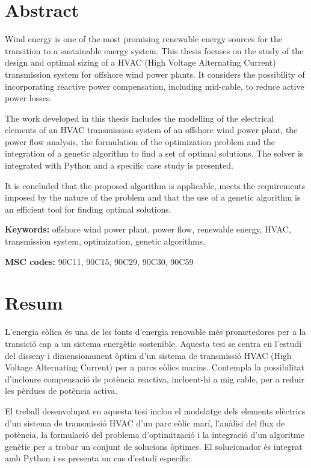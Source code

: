 \documentclass[a4paper,11pt, titlepage, twoside]{article}
\begin{document}
\section*{Abstract}

Wind energy is one of the most promising renewable energy sources for the transition to a sustainable energy system. This thesis focuses on the study of the design and optimal sizing of a HVAC (High Voltage Alternating Current) transmission system for offshore wind power plants. It considers
the possibility of incorporating reactive power compensation, including mid-cable, to reduce active power losses.

The work developed in this thesis includes the modelling of the electrical elements of an HVAC transmission system of an offshore wind power plant, the power flow analysis, the formulation of the optimization problem and the integration of a genetic algorithm to find a set of optimal solutions. The solver is integrated with Python and a specific case study is presented.

It is concluded that the proposed algorithm is applicable, meets the requirements imposed by the nature of the problem and that the use of a genetic algorithm is an efficient tool for finding optimal solutions.

\textbf{Keywords:} offshore wind power plant, power flow, renewable energy, HVAC, transmission system, optimization, genetic algorithms.


\textbf{MSC codes:} 90C11, 90C15, 90C29, 90C30, 90C59


\section*{Resum}
 
L'energia eòlica és una de les fonts d'energia renovable més prometedores per a la transició cap a un sistema energètic sostenible. Aquesta tesi se centra en l'estudi del disseny i dimensionament òptim d'un sistema de transmissió HVAC (High Voltage Alternating Current) per a parcs eòlics marins. Contempla
la possibilitat d'incloure compensació de potència reactiva, incloent-hi a mig cable, per a reduir les pèrdues de potència activa.

El treball desenvolupat en aquesta tesi inclou el modelatge dels elements elèctrics d'un sistema de transmissió HVAC d'un parc eòlic marí, l'anàlisi del flux de potència, la formulació del problema d'optimització
i la integració d'un algoritme genètic per a trobar un conjunt de solucions òptimes. El solucionador és integrat amb Python i es presenta un cas d'estudi específic.
\end{document}
